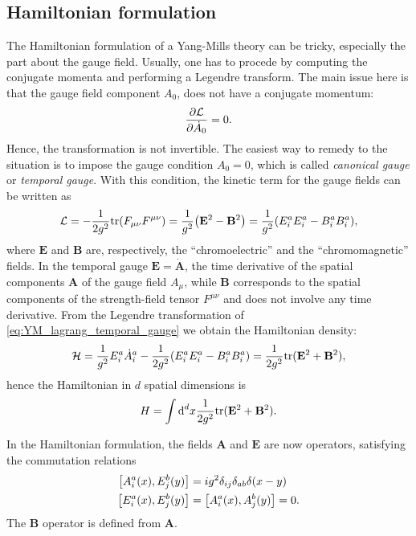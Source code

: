 \subsection{Hamiltonian formulation}
\label{sub:hamiltonian_formulation}

The Hamiltonian formulation of a Yang-Mills theory can be tricky, especially the part about the gauge field.
Usually, one has to procede by computing the conjugate momenta and performing a Legendre transform.
The main issue here is that the gauge field component $A_0$, does not have a conjugate momentum:
\begin{equation}
    \pdv{\mathcal{L}}{\dot{A}_0} = 0.
\end{equation}
Hence, the transformation is not invertible.
The easiest way to remedy to the situation is to impose the gauge condition $A_0 = 0$,
which is called \emph{canonical gauge} or \emph{temporal gauge}.
With this condition, the kinetic term for the gauge fields can be written as
\begin{equation}
    \mathcal{L}
    = - \frac{1}{2 g^2} \text{tr}(F_{\mu \nu} F^{\mu \nu})
    = \frac{1}{g^2} \qty( \mathbf{E}^2 - \mathbf{B}^2 )
    = \frac{1}{g^2} \qty(E^a_i E^a_i - B^a_i B^a_i),
    \label{eq:YM_lagrang_temporal_gauge}
\end{equation}
where $\mathbf{E}$ and $\mathbf{B}$ are, respectively, the ``chromoelectric'' and the ``chromomagnetic'' fields.
In the temporal gauge $\mathbf{E} = \dot{\mathbf{A}}$, the time derivative of the spatial components $\mathbf{A}$ of the gauge field $A_{\mu}$, while $\mathbf{B}$ corresponds to the spatial components of the strength-field tensor $F^{\mu \nu}$ and does not involve any time derivative.
From the Legendre transformation of \eqref{eq:YM_lagrang_temporal_gauge} we obtain the Hamiltonian density:
\begin{equation}
    \mathcal{H}
    = \frac{1}{g^2} E^a_i \dot{A}^a_i - \frac{1}{2 g^2} \qty( E^a_i E^a_i - B^a_i B^a_i )
    = \frac{1}{2g^2} \text{tr} ( \mathbf{E}^2 + \mathbf{B}^2 ),
\end{equation}
hence the Hamiltonian in $d$ spatial dimensions is
\begin{equation}
    H = \int \text{\normalfont d}^{d} x \frac{1}{2 g^2} \text{tr}(\mathbf{E}^2 + \mathbf{B}^2).
\end{equation}

In the Hamiltonian formulation, the fields $\mathbf{A}$ and $\mathbf{E}$ are now operators, satisfying the commutation relations
\begin{equation}
    \begin{split}
        \comm{A^a_i(x)}{E^b_j(y)} & = i g^2 \delta_{ij} \delta_{ab} \delta(x-y) \\
        \comm{E^a_i(x)}{E^b_j(y)} & = \comm{A^a_i(x)}{A^b_j(y)} = 0.
    \end{split}
    \label{eq:comm_rel_E_A_continuum}
\end{equation}
The $\mathbf{B}$ operator is defined from $\mathbf{A}$.

